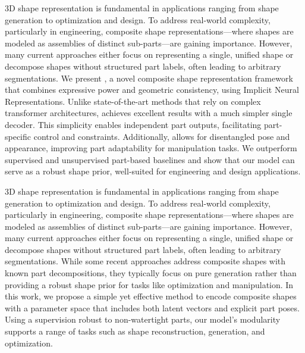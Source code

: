 
3D shape representation is fundamental in applications ranging from shape generation to optimization and design. To address real-world complexity, particularly in engineering, composite shape representations—where shapes are modeled as assemblies of distinct sub-parts—are gaining importance. However, many current approaches either focus on representing a single, unified shape or decompose shapes without structured part labels, often leading to arbitrary segmentations. 
%
We present \PSDF{}, a novel composite shape representation framework that combines expressive power and geometric consistency, using Implicit Neural Representations. Unlike state-of-the-art methods that rely on complex transformer architectures, \PSDF{} achieves excellent results with a much simpler single decoder. This simplicity enables independent part outputs, facilitating part-specific control and constraints. Additionally, \PSDF{} allows for disentangled pose and appearance, improving part adaptability for manipulation tasks.
%
We outperform supervised and unsupervised part-based baselines and show that our model can serve as a robust shape prior, well-suited for engineering and design applications.


3D shape representation is fundamental in applications ranging from shape generation to optimization and design. To address real-world complexity, particularly in engineering, composite shape representations—where shapes are modeled as assemblies of distinct sub-parts—are gaining importance. However, many current approaches either focus on representing a single, unified shape or decompose shapes without structured part labels, often leading to arbitrary segmentations. While some recent approaches address composite shapes with known part decompositions, they typically focus on pure generation rather than providing a robust shape prior for tasks like optimization and manipulation.
%
In this work, we propose a simple yet effective method to encode composite shapes with a parameter space that includes both latent vectors and explicit part poses. Using a supervision robust to non-watertight parts, our model’s modularity supports a range of tasks such as shape reconstruction, generation, and optimization. 


\fi
